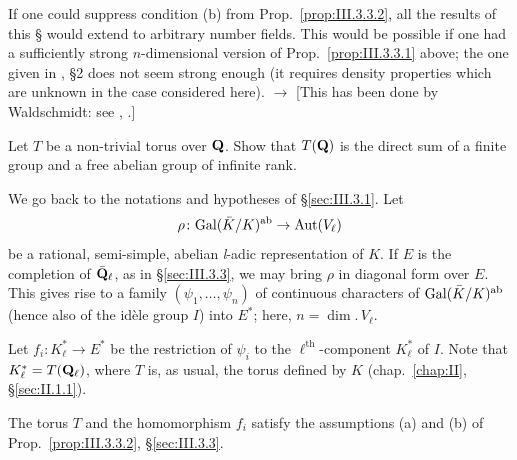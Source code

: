 
If one could suppress condition (b) from
Prop.~\ref{prop:III.3.3.2}, all the results of this \S{} would
extend to arbitrary number fields.  This would be possible if one
had a sufficiently strong $n$-dimensional version of
Prop.~\ref{prop:III.3.3.1} above; the one given in
\cite{serre-exponentielles}, \S2 does not seem strong enough (it
requires density properties which are unknown in the case
considered here).  $\rightarrow$ [This has been done by
Waldschmidt: see \cite{henniart}, \cite{waldschmidt}.]


Let $T$ be a non-trivial torus over $\mathbf{Q}$.  Show that $T(\mathbf{Q})$ is the
direct sum of a finite group and a free abelian group of infinite
rank.


We go back to the notations and hypotheses of \S\ref{sec:III.3.1}.
Let
\[
\rho\colon \mathrm{Gal}(\bar K/K)^{\mathrm{ab}}\to\mathrm{Aut}(V_\ell)
\]
be a rational, semi-simple, abelian \textit{l}-adic representation
of $K$.  If $E$ is the completion of $\bar{\mathbf{Q}}_\ell$, as in
\S\ref{sec:III.3.3}, we may bring $\rho$ in diagonal form over $E$.
This gives rise to a family $(\psi_1,\ldots,\psi_n)$ of continuous
characters of $\mathrm{Gal}(\bar K/K)^{\mathrm{ab}}$ (hence also of the
idèle group $I$) into $E^*$; here, $n=\dim.\,V_\ell$.

Let $f_i\colon K_\ell^*\to E^*$ be the restriction of $\psi_i$ to
the $\ell^{\mathrm{th}}$-component $K_\ell^*$ of $I$.  Note that
$K_\ell^*=T(\mathbf{Q}_\ell)$, where $T$ is, as usual, the torus defined by
$K$ (chap.~\ref{chap:II}, \S\ref{sec:II.1.1}).

\begin{lemma}
The torus $T$ and the homomorphism $f_i$ satisfy the assumptions
(a) and (b) of Prop.~\ref{prop:III.3.3.2}, \S\ref{sec:III.3.3}.
\end{lemma}

